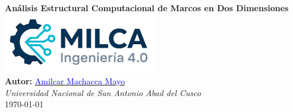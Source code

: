 \documentclass[a4paper,10pt]{book}
\begin{document}


\begin{titlepage}
    \centering
    
    \vfill
    {\Huge \textbf{Análisis Estructural Computacional de Marcos en Dos Dimensiones}}\\[3cm]

    \includegraphics[width=0.5\textwidth]{img/logo.png}\\[3cm]

    {\Large \textbf{Autor:} \href{https://github.com/Milca-py}{\textcolor{blue}{Amilcar Machacca Mayo}}}\\[0.5cm]
    
    {\large \textit{Universidad Nacional de San Antonio Abad del Cusco}}\\[1.5cm]
    
    \vfill
    {\large \today}
    \vfill
\end{titlepage}


\frontmatter
{}

\tableofcontents  %

\mainmatter
{}



\end{document}
